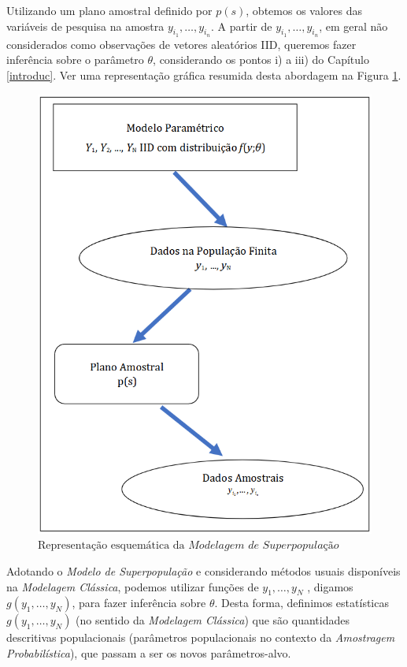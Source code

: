 \documentclass[
  12pt,
  brazilian,
]{book}
\theoremstyle{definition}
\theoremstyle{definition}
\theoremstyle{definition}
\theoremstyle{definition}
\theoremstyle{remark}
\begin{document}
Utilizando um plano amostral definido por \(p(s)\), obtemos os valores das
variáveis de pesquisa na amostra \(y_{i_1}, \ldots , y_{i_n}\). A partir de
\(y_{i_1}, \ldots , y_{i_n}\), em geral não considerados como observações de
vetores aleatórios IID, queremos fazer inferência sobre o parâmetro \(\theta\),
considerando os pontos i) a iii) do Capítulo \ref{introduc}. Ver uma representação gráfica
resumida desta abordagem na Figura \ref{fig:modsup}.

\begin{figure}

{\centering \includegraphics{Figuras/Figura2.3} 

}

\caption{$\text{Representação esquemática da }\textit{Modelagem de Superpopulação}$}\label{fig:modsup}
\end{figure}

Adotando o \emph{Modelo de Superpopulação} e considerando métodos usuais disponíveis
na \emph{Modelagem Clássica}, podemos utilizar funções de \(y_{1}, \ldots ,y_{N}\) ,
digamos \(g( y_{1}, \ldots , y_{N})\), para fazer inferência sobre \(\theta\). Desta
forma, definimos estatísticas \(g\left( y_{1}, \ldots , y_{N} \right)\) (no sentido da \emph{Modelagem Clássica}) que são quantidades descritivas populacionais (parâmetros
populacionais no contexto da \emph{Amostragem Probabilística}), que passam a ser os
novos parâmetros-alvo.
\end{document}
